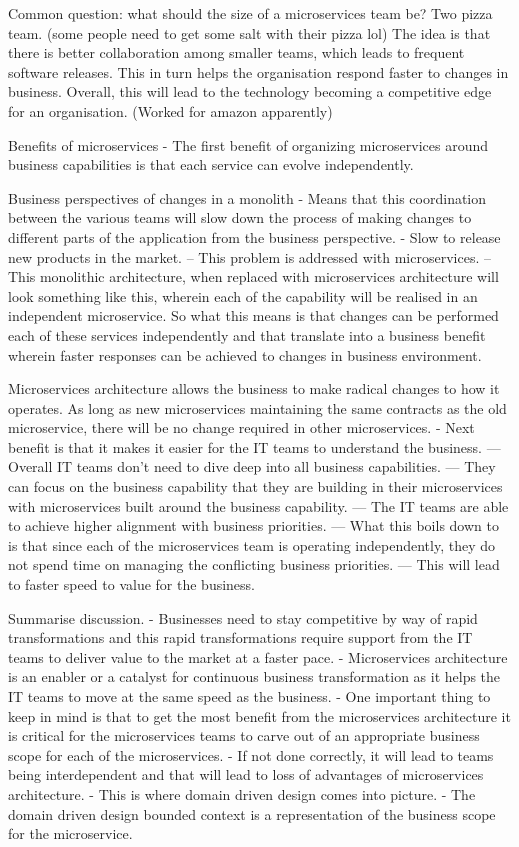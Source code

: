 \documentclass[a4paper, 11pt]{book}
\begin{document}
    Common question: what should the size of a microservices team be? Two pizza team. (some people need to get some salt with their pizza lol)
    The idea is that there is better collaboration among smaller teams, which leads to frequent software releases.
    This in turn helps the organisation respond faster to changes in business.
    Overall, this will lead to the technology becoming a competitive edge for an organisation. (Worked for amazon apparently)

    Benefits of microservices
    - The first benefit of organizing microservices around business capabilities is that each service can evolve independently.

    Business perspectives of changes in a monolith
    - Means that this coordination between the various teams will slow down the process of making changes to different parts of the application from the business perspective.
    - Slow to release new products in the market.
    -- This problem is addressed with microservices.
    -- This monolithic architecture, when replaced with microservices architecture will look something like this, wherein each of the capability will be realised in an independent microservice.
    So what this means is that changes can be performed each of these services independently and that translate into a business benefit wherein faster responses can be achieved to changes in business environment.

    Microservices architecture allows the business to make radical changes to how it operates.
    As long as new microservices maintaining the same contracts as the old microservice, there will be no change required in other microservices.
    - Next benefit is that it makes it easier for the IT teams to understand the business.
    --- Overall IT teams don't need to dive deep into all business capabilities.
    --- They can focus on the business capability that they are building in their microservices with microservices built around the business capability.
    --- The IT teams are able to achieve higher alignment with business priorities.
    --- What this boils down to is that since each of the microservices team is operating independently, they do not spend time on managing the conflicting business priorities.
    --- This will lead to faster speed to value for the business.

    Summarise discussion.
    - Businesses need to stay competitive by way of rapid transformations and this rapid transformations require support from the IT teams to deliver value to the market at a faster pace.
    - Microservices architecture is an enabler or a catalyst for continuous business transformation as it helps the IT teams to move at the same speed as the business.
    - One important thing to keep in mind is that to get the most benefit from the microservices architecture it is critical for the microservices teams to carve out of an appropriate business scope for each of the microservices.
    - If not done correctly, it will lead to teams being interdependent and that will lead to loss of advantages of microservices architecture.
    - This is where domain driven design comes into picture.
    - The domain driven design bounded context is a representation of the business scope for the microservice.
\end{document}
